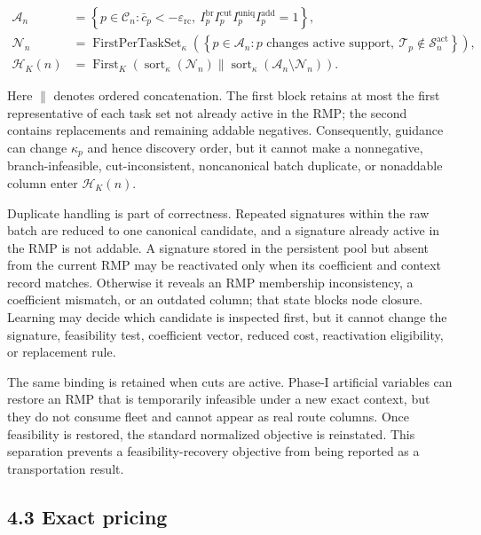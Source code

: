 \documentclass[
  11pt,
]{article}
\begin{document}
\[
\begin{aligned}
\mathcal{A}_n
&=\left\{p\in\mathcal{C}_n:
\bar c_p<-\varepsilon_{\mathrm{rc}},\
I_p^{\mathrm{br}}I_p^{\mathrm{cut}}
I_p^{\mathrm{uniq}}I_p^{\mathrm{add}}=1\right\},\\
\mathcal{N}_n
&=\operatorname{FirstPerTaskSet}_{\kappa}
\left(\left\{p\in\mathcal{A}_n:
p\text{ changes active support},\
\mathcal{T}_p\notin\mathcal{S}_n^{\mathrm{act}}\right\}\right),\\
\mathcal{H}_K(n)
&=\operatorname{First}_K\!\left(
\operatorname{sort}_{\kappa}(\mathcal{N}_n)
\mathbin{\|}\operatorname{sort}_{\kappa}(\mathcal{A}_n\setminus\mathcal{N}_n)
\right).
\end{aligned}
\tag{15}
\]

Here \(\|\) denotes ordered concatenation. The first block retains at
most the first representative of each task set not already active in the
RMP; the second contains replacements and remaining addable negatives.
Consequently, guidance can change \(\kappa_p\) and hence discovery
order, but it cannot make a nonnegative, branch-infeasible,
cut-inconsistent, noncanonical batch duplicate, or nonaddable column
enter \(\mathcal{H}_K(n)\).

Duplicate handling is part of correctness. Repeated signatures within
the raw batch are reduced to one canonical candidate, and a signature
already active in the RMP is not addable. A signature stored in the
persistent pool but absent from the current RMP may be reactivated only
when its coefficient and context record matches. Otherwise it reveals an
RMP membership inconsistency, a coefficient mismatch, or an outdated
column; that state blocks node closure. Learning may decide which
candidate is inspected first, but it cannot change the signature,
feasibility test, coefficient vector, reduced cost, reactivation
eligibility, or replacement rule.

The same binding is retained when cuts are active. Phase-I artificial
variables can restore an RMP that is temporarily infeasible under a new
exact context, but they do not consume fleet and cannot appear as real
route columns. Once feasibility is restored, the standard normalized
objective is reinstated. This separation prevents a feasibility-recovery
objective from being reported as a transportation result.

\hypertarget{exact-pricing}{%
\subsection{4.3 Exact pricing}\label{exact-pricing}}
\end{document}
